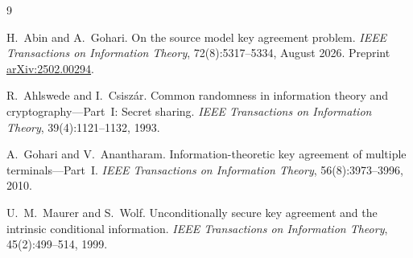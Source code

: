 \documentclass[11pt]{article}
\theoremstyle{plain}
\theoremstyle{definition}
\theoremstyle{remark}
\begin{document}
\begin{thebibliography}{9}

H.~Abin and A.~Gohari.
On the source model key agreement problem.
\emph{IEEE Transactions on Information Theory}, 72(8):5317--5334, August 2026.
Preprint \href{https://arxiv.org/abs/2502.00294}{arXiv:2502.00294}.

R.~Ahlswede and I.~Csisz\'ar.
Common randomness in information theory and cryptography---Part~I: Secret sharing.
\emph{IEEE Transactions on Information Theory}, 39(4):1121--1132, 1993.

A.~Gohari and V.~Anantharam.
Information-theoretic key agreement of multiple terminals---Part~I.
\emph{IEEE Transactions on Information Theory}, 56(8):3973--3996, 2010.

U.~M.~Maurer and S.~Wolf.
Unconditionally secure key agreement and the intrinsic conditional information.
\emph{IEEE Transactions on Information Theory}, 45(2):499--514, 1999.

\end{thebibliography}
\end{document}
